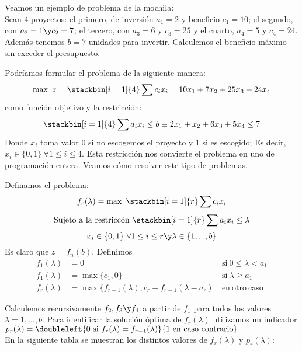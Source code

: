 \newpage\begin{ejem} Veamos un ejemplo de problema de la mochila:\\

Sean 4 proyectos: el primero, de inversión $a_1=2$ y beneficio $c_1=10$; el segundo, con $a_2=1\y c_2=7$; el tercero, con $a_3=6$ y $c_3=25$ y el cuarto, $a_4=5$ y $c_4=24$. Además tenemos $b=7$ unidades para invertir. Calculemos el beneficio máximo sin exceder el presupuesto.

Podríamos formular el problema de la siguiente manera:
\[\max\ z = \stackbin[i=1]{4}\sum c_ix_i=10x_1+7x_2+25x_3+24x_4\]
como función objetivo y la restricción:
\[\stackbin[i=1]{4}\sum a_ix_i\leq b\equiv 2x_1+x_2+6x_3+5x_4\leq 7\]
Donde $x_i$ toma valor 0 si no escogemos el proyecto y 1 si es escogido; Es decir,\\
$x_i\in\{0,1\}\ \forall 1\leq i\leq 4$. Esta restricción nos convierte el problema en uno de programación entera. Veamos cómo resolver este tipo de problemas.

Definamos el problema:
\[f_r(\lambda)=\max\ \stackbin[i=1]{r}\sum c_ix_i\]
\[\mathrm{Sujeto\ a\ la\ restricc\acute{o}n\ }\stackbin[i=1]{r}\sum a_ix_i\leq\lambda\]
\[x_i\in\{0,1\}\ \forall 1\leq i\leq r\y\lambda\in\{1,...,b\}\]
Es claro que $z=f_n(b)$. Definimos \begin{align*} f_1(\lambda)&=0&\mathrm{\ si\ } 0\leq\lambda<a_1\\
f_1(\lambda)&=\max\{c_1,0\}&\mathrm{\ si\ } \lambda\geq a_1\\
f_r(\lambda)&=\max\{f_{r-1}(\lambda), c_r+f_{r-1}(\lambda-a_r)&\mathrm{\ en\ otro\ caso}
\end{align*}

Calculemos recursivamente $f_2,f_3\y f_4$ a partir de $f_1$ para todos los valores $\lambda=1,...,b$. Para identificar la solución óptima de $f_r(\lambda)$ utilizamos un indicador\\
$p_r(\lambda)=\doubleleft{0\mathrm{\ si\ }f_r(\lambda)=f_{r-1}(\lambda)}{1 \mathrm{\ en\ caso\ contrario}}$\\

En la siguiente tabla se muestran los distintos valores de $f_r(\lambda)$ y $p_r(\lambda)$:


\end{ejem}

